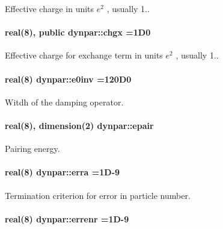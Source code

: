 Effective charge in units $ e^2 $ , usually 1.. 

\paragraph[{\texorpdfstring{chgx}{chgx}}]{\setlength{\rightskip}{0pt plus 5cm}real(8), public dynpar\+::chgx =1\+D0}\hypertarget{namespacedynpar_a7b67156cd9a853a9e1b081318599d47a}{}\label{namespacedynpar_a7b67156cd9a853a9e1b081318599d47a}


Effective charge for exchange term in units $ e^2 $ , usually 1.. 

\paragraph[{\texorpdfstring{e0inv}{e0inv}}]{\setlength{\rightskip}{0pt plus 5cm}real(8) dynpar\+::e0inv =120\+D0}\hypertarget{namespacedynpar_adb20e834bea1f9c5916b6dcf71117310}{}\label{namespacedynpar_adb20e834bea1f9c5916b6dcf71117310}


Witdh of the damping operator. 

\paragraph[{\texorpdfstring{epair}{epair}}]{\setlength{\rightskip}{0pt plus 5cm}real(8), dimension(2) dynpar\+::epair}\hypertarget{namespacedynpar_ac04788950822d4daab61ae4a7aa49e6f}{}\label{namespacedynpar_ac04788950822d4daab61ae4a7aa49e6f}


Pairing energy. 

\paragraph[{\texorpdfstring{erra}{erra}}]{\setlength{\rightskip}{0pt plus 5cm}real(8) dynpar\+::erra =1\+D-\/9}\hypertarget{namespacedynpar_acfc09d77f0f8e8c7d7e8d35ba37d1183}{}\label{namespacedynpar_acfc09d77f0f8e8c7d7e8d35ba37d1183}


Termination criterion for error in particle number. 

\paragraph[{\texorpdfstring{errenr}{errenr}}]{\setlength{\rightskip}{0pt plus 5cm}real(8) dynpar\+::errenr =1\+D-\/9}\hypertarget{namespacedynpar_a18628c991498b8604535ab88dc8d6138}{}\label{namespacedynpar_a18628c991498b8604535ab88dc8d6138}


